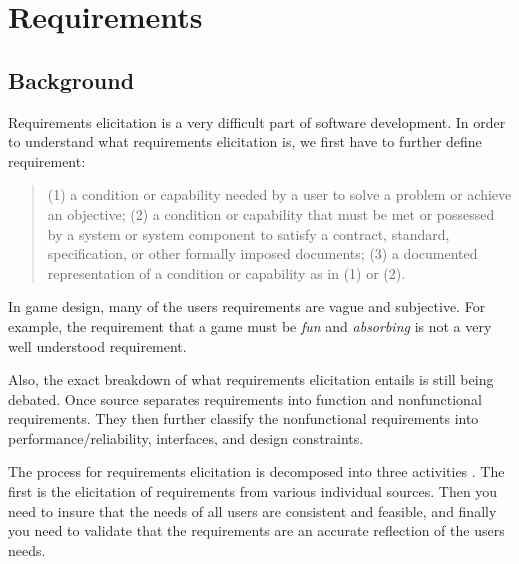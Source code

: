 \section{Requirements}
\subsection{Background}
Requirements elicitation is a very difficult part of software development. In order to understand what requirements elicitation is, we first have to further define requirement:
\begin{quote}
	(1) a condition or capability needed by a user to solve a problem or achieve an objective; (2) a condition or capability that must be met or possessed by a system or system component to satisfy a contract, standard, specification, or other formally imposed documents; (3) a documented representation of a condition or capability as in (1) or (2)\cite{september1990ieee}.
\end{quote}
In game design, many of the users requirements are vague and subjective. For example, the requirement that a game must be \emph{fun} and \emph{absorbing} is not a very well understood requirement. 

Also, the exact breakdown of what requirements elicitation entails is still being debated. Once source separates requirements into function and nonfunctional requirements\cite{southwell1987requirements}. They then further classify the nonfunctional requirements into performance/reliability, interfaces, and design constraints.

The process for requirements elicitation is decomposed into three activities \cite{rzepka1989requirements}. The first is the elicitation of requirements from various individual sources. Then you need to insure that the needs of all users are consistent and feasible, and finally you need to validate that the requirements are an accurate reflection of the users needs.

